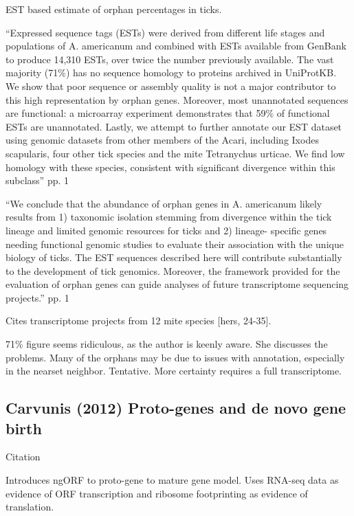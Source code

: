     EST based estimate of orphan percentages in ticks.

    ``Expressed sequence tags (ESTs) were derived from different life stages
    and populations of A. americanum and combined with ESTs available from
    GenBank to produce 14,310 ESTs, over twice the number previously available.
    The vast majority (71\%) has no sequence homology to proteins archived in
    UniProtKB. We show that poor sequence or assembly quality is not a major
    contributor to this high representation by orphan genes. Moreover, most
    unannotated sequences are functional: a microarray experiment demonstrates
    that 59\% of functional ESTs are unannotated. Lastly, we attempt to further
    annotate our EST dataset using genomic datasets from other members of the
    Acari, including Ixodes scapularis, four other tick species and the mite
    Tetranychus urticae. We find low homology with these species, consistent
    with significant divergence within this subclass'' pp. 1

    ``We conclude that the abundance of orphan genes in A. americanum likely results
    from 1) taxonomic isolation stemming from divergence within the tick lineage
    and limited genomic resources for ticks and 2) lineage- specific genes needing
    functional genomic studies to evaluate their association with the unique
    biology of ticks.  The EST sequences described here will contribute
    substantially to the development of tick genomics. Moreover, the framework
    provided for the evaluation of orphan genes can guide analyses of future
    transcriptome sequencing projects.'' pp. 1

    Cites transcriptome projects from 12 mite species [hers, 24-35].

    71\% figure seems ridiculous, as the author is keenly aware. She discusses
    the problems. Many of the orphans may be due to issues with annotation,
    especially in the nearset neighbor. Tentative. More certainty requires a
    full transcriptome.

\subsection{Carvunis (2012) Proto-genes and de novo gene birth}

    Citation \cite{carvunis_proto-genes_2012}

    Introduces ngORF to proto-gene to mature gene model. Uses RNA-seq data
    as evidence of ORF transcription and ribosome footprinting as evidence
    of translation.

